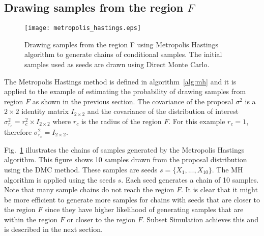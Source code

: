 \documentclass[journal]{IEEEtran}
\begin{document}
\subsection{Drawing samples from the region $F$}

\begin{figure}[h]\centering
	\texttt{[image: metropolis\_hastings.eps]}
\caption{Drawing samples from the region F using Metropolis Hastings algorithm to generate chains of conditional samples. The initial samples used as seeds are drawn using Direct Monte Carlo.}
	\label{fig:mh}
\end{figure}

The Metropolis Hastings method is defined in algorithm~\ref{alg:mh} and it is applied to the example of estimating the probability of drawing samples from region $F$ as shown in the previous section. The covariance of the proposal $\sigma^{2}$ is a $2 \times 2$ identity matrix $I_{2 \times 2}$ and the covariance of the distribution of interest $\sigma_{r_{c}}^{2} = r_{c}^{2} \times I_{2 \times 2}$ where $r_{c}$ is the radius of the region $F$. For this example $r_{c} = 1$, therefore $\sigma_{r_{c}}^{2} = I_{2 \times 2}$.

Fig.~\ref{fig:mh} illustrates the chains of samples generated by the Metropolis Hastings algorithm. This figure shows 10 samples drawn from the proposal distribution using the DMC method. These samples are seeds $s =\{X_{1},...,X_{10}\}$. The MH algorithm is applied using the seeds $s$. Each seed generates a chain of 10 samples. Note that many sample chains do not reach the region $F$. It is clear that it might be more efficient to generate more samples for chains with seeds that are closer to the region $F$ since they have higher likelihood of generating samples that are within the region $F$ or closer to the region $F$. Subset Simulation achieves this and is described in the next section.
\end{document}
